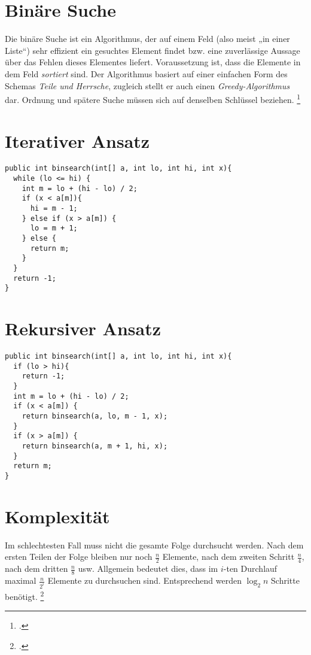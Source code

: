 \documentclass{lehramt-informatik-haupt}
\begin{document}
%

\section{Binäre Suche}

Die binäre Suche ist ein Algorithmus, der auf einem Feld (also meist „in
einer Liste“) sehr effizient ein gesuchtes Element findet bzw. eine
zuverlässige Aussage über das Fehlen dieses Elementes liefert.
Voraussetzung ist, dass die Elemente in dem Feld \emph{sortiert} sind.
Der Algorithmus basiert auf einer einfachen Form des Schemas \emph{Teile
und Herrsche}, zugleich stellt er auch einen \emph{Greedy-Algorithmus}
dar. Ordnung und spätere Suche müssen sich auf denselben Schlüssel
beziehen.
\footcite{wiki:binaere-suche}

\cite[Seite 17 (PDF 9)]{aud:fs:2}

\section{Iterativer Ansatz}

\begin{verbatim}
public int binsearch(int[] a, int lo, int hi, int x){
  while (lo <= hi) {
    int m = lo + (hi - lo) / 2;
    if (x < a[m]){
      hi = m - 1;
    } else if (x > a[m]) {
      lo = m + 1;
    } else {
      return m;
    }
  }
  return -1;
}
\end{verbatim}

\section{Rekursiver Ansatz}

\begin{verbatim}
public int binsearch(int[] a, int lo, int hi, int x){
  if (lo > hi){
    return -1;
  }
  int m = lo + (hi - lo) / 2;
  if (x < a[m]) {
    return binsearch(a, lo, m - 1, x);
  }
  if (x > a[m]) {
    return binsearch(a, m + 1, hi, x);
  }
  return m;
}
\end{verbatim}


\section{Komplexität}

Im schlechtesten Fall muss nicht die gesamte Folge durchsucht werden.
Nach dem ersten Teilen der Folge bleiben nur noch $\frac{n}{2}$
Elemente, nach dem zweiten Schritt $\frac{n}{4}$, nach dem dritten
$\frac{n}{8}$ usw. Allgemein bedeutet dies, dass im $i$-ten Durchlauf
maximal $\frac{n}{2^i}$ Elemente zu durchsuchen sind. Entsprechend
werden $\log_2 n$ Schritte benötigt.
\footcite[Seite 122]{saake}

\literatur
\end{document}
